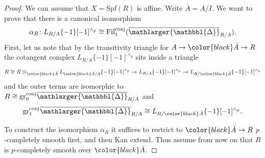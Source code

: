 \documentclass{amsart}
\newcommand{\prism}{{\mathlarger{\mathbbl{\Delta}}}}
\theoremstyle{plain}
\theoremstyle{definition}
\newcommand{\blue}[1]{{\color{black}#1}}
\begin{document}
\begin{proof}
We can assume that $X=\mathrm{Spf}(R)$ is affine. \blue{Write $\bar{A}=A/I$.} We want to prove that there is a canonical isomorphism
$$
\alpha_R \colon L_{R/A}\{-1\}[-1]^{\wedge_p}\cong \mathrm{Fil}_{1}^{\mathrm{conj}}(\overline{\prism}_{R/A}).
$$
First, let us note that by the transitivity triangle for $A\to \blue{\bar{A}} \to R$ the cotangent complex $L_{R/A}\{-1\}[-1]^{\wedge_p}$ sits inside a triangle
$$
R\cong R\otimes_{\blue{\bar{A}}}L_{\blue{\bar{A}}/A}\{-1\}[-1]^{\wedge_p}\to L_{R/A}\{-1\}[-1]^{\wedge_p}\to L_{R/\blue{\bar{A}}}\{-1\}[-1]^{\wedge_p}
$$
and the outer terms are isomorphic to $R\cong \mathrm{gr}_{0}^{\mathrm{conj}}\overline{\prism}_{R/A}$ and
$$\mathrm{gr}_{1}^{\mathrm{conj}}\overline{\prism}_{R/A}\cong L_{R/\blue{\bar{A}}}\{-1\}[-1]^{\wedge_p}. $$

To construct the isomorphism $\alpha_R$ it suffices to restrict to $\blue{\bar{A}}\to R$ $p$-completely smooth first, and then Kan extend. Thus assume from now on that $R$ is $p$-completely smooth over $\blue{\bar{A}}$.


\end{proof}
\end{document}
